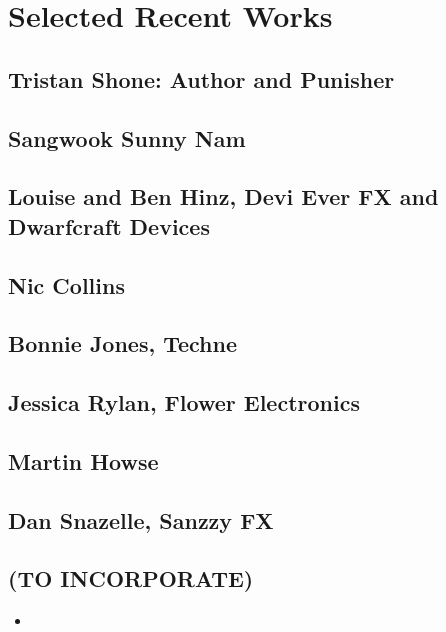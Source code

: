 \chapter{Selected Recent Works}\label{selrecworks}

\section{Tristan Shone: Author and Punisher}



\section{Sangwook Sunny Nam}

\section{Louise and Ben Hinz, Devi Ever FX and Dwarfcraft Devices}

\section{Nic Collins}

\section{Bonnie Jones, Techne}

\section{Jessica Rylan, Flower Electronics}

\section{Martin Howse}

\section{Dan Snazelle, Sanzzy FX}


\begin{unsortedStuff}	
\section*{(TO INCORPORATE)}
	\begin{itemize}
		\item 
	\end{itemize}
\end{unsortedStuff}
		
\begin{optBlankSpace}
	\newpage
	\mbox{}
\end{optBlankSpace}


